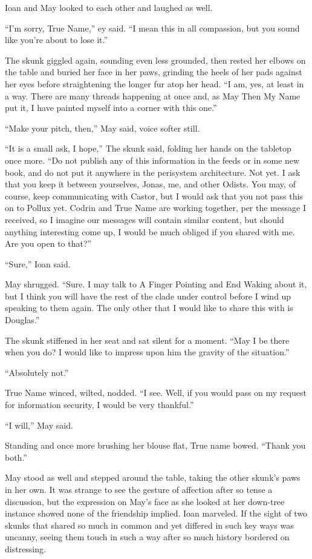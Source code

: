 Ioan and May looked to each other and laughed as well.

``I'm sorry, True Name,'' ey said. ``I mean this in all compassion, but you sound like you're about to lose it.''

The skunk giggled again, sounding even less grounded, then rested her elbows on the table and buried her face in her paws, grinding the heels of her pads against her eyes before straightening the longer fur atop her head. ``I am, yes, at least in a way. There are many threads happening at once and, as May Then My Name put it, I have painted myself into a corner with this one.''

``Make your pitch, then,'' May said, voice softer still.

``It is a small ask, I hope,'' The skunk said, folding her hands on the tabletop once more. ``Do not publish any of this information in the feeds or in some new book, and do not put it anywhere in the perisystem architecture. Not yet. I ask that you keep it between yourselves, Jonas, me, and other Odists. You may, of course, keep communicating with Castor, but I would ask that you not pass this on to Pollux yet. Codrin and True Name are working together, per the message I received, so I imagine our messages will contain similar content, but should anything interesting come up, I would be much obliged if you shared with me. Are you open to that?''

``Sure,'' Ioan said.

May shrugged. ``Sure. I may talk to A Finger Pointing and End Waking about it, but I think you will have the rest of the clade under control before I wind up speaking to them again. The only other that I would like to share this with is Douglas.''

The skunk stiffened in her seat and sat silent for a moment. ``May I be there when you do? I would like to impress upon him the gravity of the situation.''

``Absolutely not.''

True Name winced, wilted, nodded. ``I see. Well, if you would pass on my request for information security, I would be very thankful.''

``I will,'' May said.

Standing and once more brushing her blouse flat, True name bowed. ``Thank you both.''

May stood as well and stepped around the table, taking the other skunk's paws in her own. It was strange to see the gesture of affection after so tense a discussion, but the expression on May's face as she looked at her down-tree instance showed none of the friendship implied. Ioan marveled. If the sight of two skunks that shared so much in common and yet differed in such key ways was uncanny, seeing them touch in such a way after so much history bordered on distressing.

